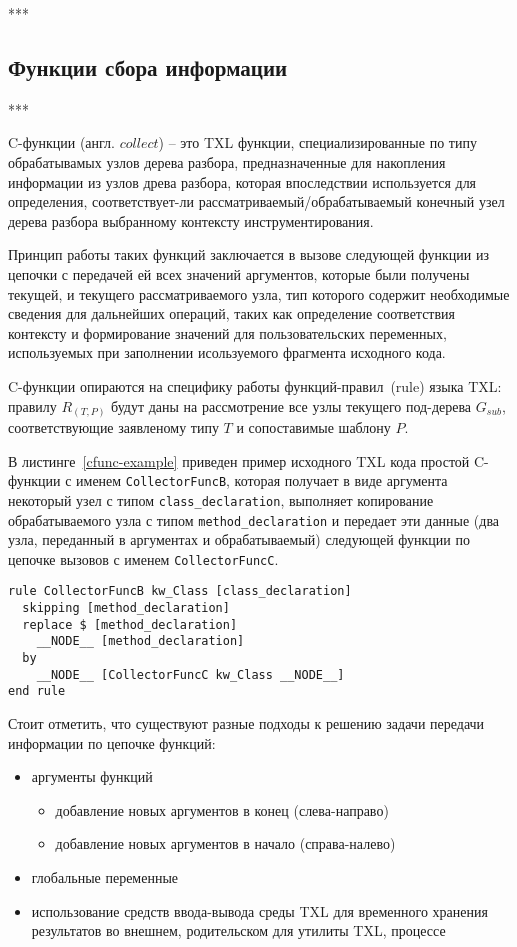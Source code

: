 ***

\subsection{Функции сбора информации}

***

C-функции (англ. $collect$) -- это TXL функции, специализированные по типу обрабатывамых узлов дерева разбора, предназначенные для накопления информации из узлов древа разбора, которая впоследствии используется для определения, соответствует-ли рассматриваемый/обрабатываемый конечный узел дерева разбора выбранному контексту инструментирования.

Принцип работы таких функций заключается в вызове следующей функции из цепочки с передачей ей всех значений аргументов, которые были получены текущей, и текущего рассматриваемого узла, тип которого содержит необходимые сведения для дальнейших операций, таких как определение соответствия контексту и формирование значений для пользовательских переменных, используемых при заполнении исользуемого фрагмента исходного кода.

C-функции опираются на специфику работы функций-правил~(rule) языка TXL: правилу $R_{(T,P)}$ будут даны на рассмотрение все узлы текущего под-дерева $G_{sub}$, соответствующие заявленому типу $T$ и сопоставимые шаблону $P$.

В листинге~\ref{cfunc-example} приведен пример исходного TXL кода простой C-функции с именем \lstinline{CollectorFuncB}, которая получает в виде аргумента некоторый узел с типом \lstinline{class_declaration}, выполняет копирование обрабатываемого узла с типом \lstinline{method_declaration} и передает эти данные (два узла, переданный в аргументах и обрабатываемый) следующей функции по цепочке вызовов с именем \lstinline{CollectorFuncC}.

\begin{lstlisting}[frame=single, language=TXL, label={cfunc-example}, caption={Пример C-функции}]
rule CollectorFuncB kw_Class [class_declaration]
  skipping [method_declaration]
  replace $ [method_declaration]
    __NODE__ [method_declaration]
  by
    __NODE__ [CollectorFuncC kw_Class __NODE__]
end rule
\end{lstlisting}

Стоит отметить, что существуют разные подходы к решению задачи передачи информации по цепочке функций:
\begin {itemize}[noitemsep]
  \item аргументы функций
    \begin{itemize}[noitemsep]
      \item добавление новых аргументов в конец (слева-направо)
      \item добавление новых аргументов в начало (справа-налево)
    \end{itemize}
  \item глобальные переменные
  \item использование средств ввода-вывода среды TXL для временного хранения результатов во внешнем, родительском для утилиты TXL, процессе
\end{itemize}

